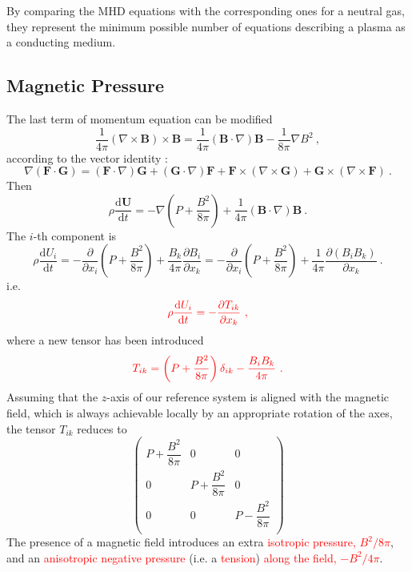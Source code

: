 \documentclass[12pt,a4paper]{article}
\renewcommand{\vec}[1]{\boldsymbol{#1}}
\newcommand{\dif}{\mathrm{d}}
\begin{document}
By comparing the MHD equations with the corresponding ones for a neutral gas, they represent the minimum possible number of equations describing a plasma as a conducting medium. 

\subsection{Magnetic Pressure}
The last term of momentum equation can be modified
\begin{equation*}
\frac{1}{4\pi} (\nabla \times \vec{B}) \times \vec{B} = \frac{1}{4\pi}  (\vec{B} \cdot  \nabla)\vec{B} - \frac{1}{8\pi} \nabla B^2 ~,
\end{equation*}
according to the vector identity :
\begin{equation*}
\nabla (\vec{F} \cdot \vec{G}) = (\vec{F} \cdot  \nabla)\vec{G} +(\vec{G}\cdot \nabla)\vec{F} +\vec{F}\times (\nabla \times \vec{G}) +\vec{G} \times (\nabla \times \vec{F}) ~.
\end{equation*}
Then
\begin{equation}
\rho \frac{\dif \vec{U}}{\dif t} = -\nabla \left(P+\frac{B^2}{8\pi} \right) +\frac{1}{4\pi}  (\vec{B} \cdot  \nabla)\vec{B} ~.
\end{equation}
The $i$-th component is
\begin{equation*}
\rho \frac{\dif U_i}{\dif t} = -\frac{\partial}{\partial x_i} \left(P+\frac{B^2}{8\pi} \right) +\frac{B_k}{4\pi} \frac{\partial B_i}{\partial x_k}  = -\frac{\partial}{\partial x_i} \left(P+\frac{B^2}{8\pi} \right) +\frac{1}{4\pi} \frac{\partial (B_i B_k)}{\partial x_k} ~.
\end{equation*}
i.e.
\begin{equation}
 \color{red} \rho \frac{\dif U_i}{\dif t} = -\frac{\partial T_{ik}}{\partial x_k} ~,
\end{equation}
where a new tensor has been introduced
\begin{equation}
 \color{red} T_{ik} = \left(P+\frac{B^2}{8\pi} \right)\delta_{ik} -\frac{B_i B_k}{4\pi} ~.
\end{equation}
Assuming that the $z$-axis of our reference system is aligned with the magnetic field, which is always achievable locally by an appropriate rotation of the axes, the tensor $T_{ik}$ reduces to
\begin{equation}
\begin{pmatrix}
P+\dfrac{B^2}{8\pi} & 0 & 0 \\
  0 & P+\dfrac{B^2}{8\pi}& 0 \\
  0 & 0 & P-\dfrac{B^2}{8\pi}\\
\end{pmatrix}
\end{equation}
The presence of a magnetic field introduces an extra \textcolor{red}{isotropic pressure, $B^2/8\pi$}, and an \textcolor{red}{anisotropic negative pressure} (i.e. a \textcolor{red}{tension}) \textcolor{red}{along the field, $-B^2/4\pi$}. 
\end{document}
